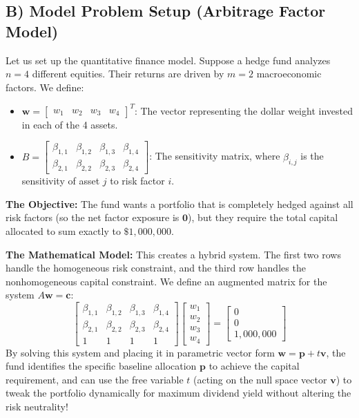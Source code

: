 \documentclass[11pt]{article}
\begin{document}
\subsection{B) Model Problem Setup (Arbitrage Factor Model)}
Let us set up the quantitative finance model. Suppose a hedge fund analyzes $n=4$ different equities. Their returns are driven by $m=2$ macroeconomic factors. We define:
\begin{itemize}
    \item $\mathbf{w} = \begin{bmatrix} w_1 & w_2 & w_3 & w_4 \end{bmatrix}^T$: The vector representing the dollar weight invested in each of the 4 assets.
    \item $B = \begin{bmatrix} \beta_{1,1} & \beta_{1,2} & \beta_{1,3} & \beta_{1,4} \\ \beta_{2,1} & \beta_{2,2} & \beta_{2,3} & \beta_{2,4} \end{bmatrix}$: The sensitivity matrix, where $\beta_{i,j}$ is the sensitivity of asset $j$ to risk factor $i$.
\end{itemize}

\textbf{The Objective:} The fund wants a portfolio that is completely hedged against all risk factors (so the net factor exposure is $\mathbf{0}$), but they require the total capital allocated to sum exactly to $\$1,000,000$. 

\textbf{The Mathematical Model:}
This creates a hybrid system. The first two rows handle the homogeneous risk constraint, and the third row handles the nonhomogeneous capital constraint.
We define an augmented matrix for the system $A\mathbf{w} = \mathbf{c}$:
\[
\begin{bmatrix}
\beta_{1,1} & \beta_{1,2} & \beta_{1,3} & \beta_{1,4} \\
\beta_{2,1} & \beta_{2,2} & \beta_{2,3} & \beta_{2,4} \\
1 & 1 & 1 & 1
\end{bmatrix}
\begin{bmatrix} w_1 \\ w_2 \\ w_3 \\ w_4 \end{bmatrix}
=
\begin{bmatrix} 0 \\ 0 \\ 1,000,000 \end{bmatrix}
\]
By solving this system and placing it in parametric vector form $\mathbf{w} = \mathbf{p} + t\mathbf{v}$, the fund identifies the specific baseline allocation $\mathbf{p}$ to achieve the capital requirement, and can use the free variable $t$ (acting on the null space vector $\mathbf{v}$) to tweak the portfolio dynamically for maximum dividend yield without altering the risk neutrality!
\end{document}
